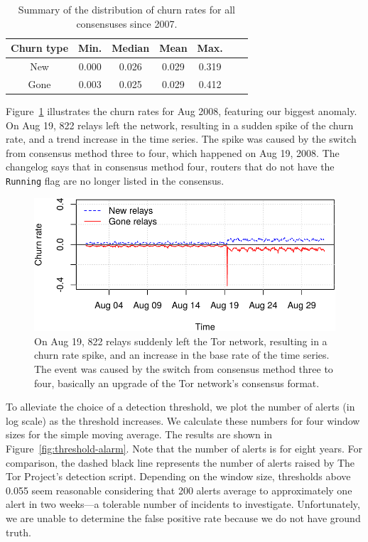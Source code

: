 \begin{table}[t]
	\centering
	\begin{tabular}{ccccccc}
	\textbf{Churn type} & \textbf{Min.} & \textbf{Median} & \textbf{Mean} & \textbf{Max.} \\
	\hline
	New & 0.000 & 0.026 & 0.029 & 0.319 \\
	Gone & 0.003 & 0.025 & 0.029 & 0.412 \\
	\end{tabular}
	\caption{Summary of the distribution of churn rates for all consensuses
	since 2007.}
	\label{tab:churn-dist}
\end{table}

Figure~\ref{fig:2008-08} illustrates the churn rates for Aug 2008, featuring
our biggest anomaly.  On Aug 19, 822 relays left the network, resulting in a
sudden spike of the churn rate, and a trend increase in the time series.  The
spike was caused by the switch from consensus method three to four, which
happened on Aug 19, 2008.  The changelog says that in consensus method four,
routers that do not have the \texttt{Running} flag are no longer listed in the
consensus.

\begin{figure}[t]
	\centering
	\includegraphics[width=\linewidth]{diagrams/2008-08.pdf}
	\caption{On Aug 19, 822 relays suddenly left the Tor network, resulting in a
	churn rate spike, and an increase in the base rate of the time series.  The
	event was caused by the switch from consensus method three to four,
	basically an upgrade of the Tor network's consensus format.}
	\label{fig:2008-08}
\end{figure}

To alleviate the choice of a detection threshold, we plot the number of alerts
(in log scale) as the threshold increases.  We calculate these numbers for four
window sizes for the simple moving average.  The results are shown in
Figure~\ref{fig:threshold-alarm}.  Note that the number of alerts is for eight
years.  For comparison, the dashed black line represents the number of alerts
raised by The Tor Project's detection script.  Depending on the window size,
thresholds above 0.055 seem reasonable considering that 200 alerts average to
approximately one alert in two weeks---a tolerable number of incidents to
investigate.  Unfortunately, we are unable to determine the false positive rate
because we do not have ground truth.

